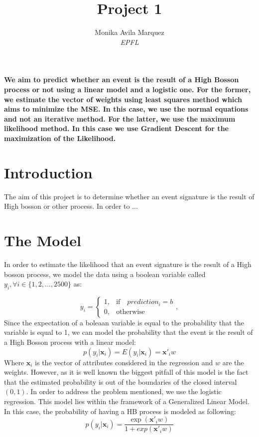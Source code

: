 \documentclass[10pt,conference,compsocconf]{IEEEtran}
\begin{document}
\title{Project 1}

\author{
  Monika Avila Marquez \\
  \textit{EPFL}
}

\maketitle

\begin{abstract}
  
\end{abstract}	\textbf{We aim to predict whether an event is the result of a High Bosson process or not using a linear model and a logistic one. For the former, we estimate the vector of weights using  least squares method which aims to minimize the MSE. In this case, we use the normal equations and not an iterative method. For the latter, we use the maximum likelihood method. In this case we use Gradient Descent for the maximization of the Likelihood.  }

\section{Introduction}

The aim of this project is to determine whether an event signature is the result of High bosson or other process. In order to ...
\section{The Model}
\label{S1}
In order to estimate the likelihood that an event signature is the result of a High bosson process, we model the data using a boolean variable called $y_i, \forall i \in  \{1, 2, ..., 2500\}  $ as:

 $$
y_{i}=
\begin{cases}
1, & \text{if} \quad prediction_i=b\\
0, & \text{otherwise}
\end{cases}
, 
$$
Since the expectation of a boleaan variable is equal to the probability that the variable is equal to 1, we can model the probability that the event is the result of a High Bosson process with a linear model:
$$p(y_i|\textbf{x}_i)=E(y_i|\textbf{x}_i)=\textbf{x}'_i w$$
Where $\textbf{x}_i $ is the vector of attributes considered in the regression and $w $ are the weights.
However, as it is well known the biggest pitfall of this model is the fact that the estimated probability is out of the boundaries of the closed interval $ ( 0,1 ) $. 
In order to address the problem mentioned, we use the logistic regression. This model lies within the framework of a Generalized Linear Model.  In this case, the probability of having a HB process is modeled as following:
$$p(y_i|\textbf{x}_i)=\frac{\exp(\textbf{x}'_i w)}{1+exp(\textbf{x}'_i w)}$$
\end{document}
